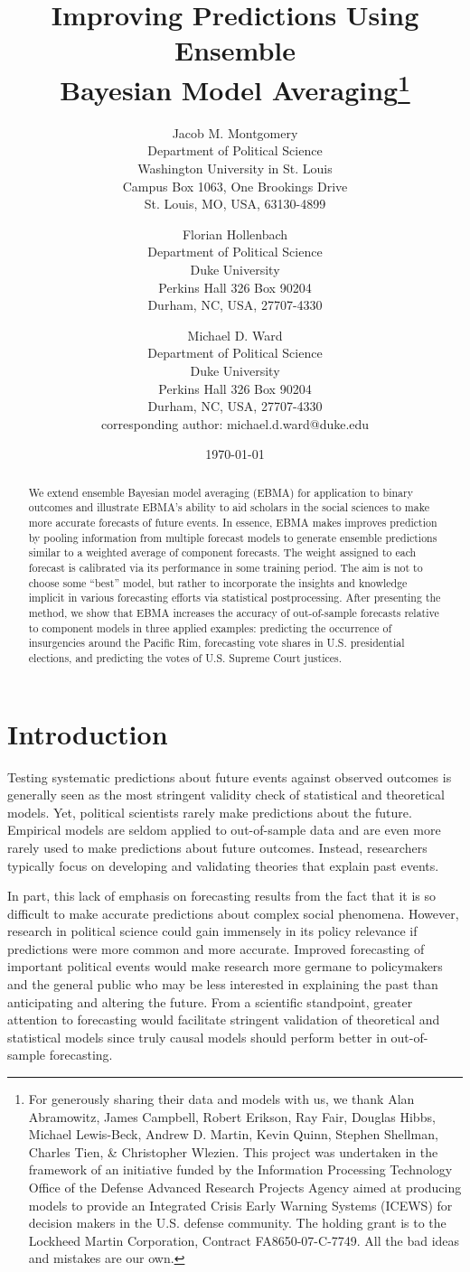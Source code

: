 \documentclass[12pt,fullpage]{article}
\title{Improving Predictions Using Ensemble \\ Bayesian Model
  Averaging\thanks{For generously sharing their data and models with
    us, we thank Alan Abramowitz, James Campbell, Robert Erikson, Ray
    Fair, Douglas Hibbs, Michael Lewis-Beck, Andrew D. Martin, Kevin
    Quinn, Stephen Shellman, Charles Tien, \& Christopher Wlezien.
    This project was undertaken in the framework of an initiative
    funded by the Information Processing Technology Office of the
    Defense Advanced Research Projects Agency aimed at producing
    models to provide an Integrated Crisis Early Warning Systems
    (ICEWS) for decision makers in the U.S. defense community. The
    holding grant is to the Lockheed Martin Corporation, Contract
    FA8650-07-C-7749. All the bad ideas and mistakes are our own.  }}
\author{
Jacob M. Montgomery\\
	Department of Political Science\\
	Washington University in St. Louis\\
	Campus Box 1063, One Brookings Drive\\
	St. Louis, MO, USA, 63130-4899 
	\and
Florian Hollenbach  \\
	Department of Political Science\\
	Duke University\\
	Perkins Hall 326 Box 90204\\
	Durham, NC, USA, 27707-4330
	\and
Michael D. Ward\\
	Department of Political Science\\
	Duke University\\
	Perkins Hall 326 Box 90204\\
	Durham, NC, USA, 27707-4330\\
	corresponding author: michael.d.ward@duke.edu
}
\date{\today}
\begin{document}
\maketitle
\thispagestyle{empty}
\clearpage
\pagestyle{myheadings}

\setcounter{page}{1}
\begin{abstract}
\begin{doublespace}
  We extend ensemble Bayesian model averaging (EBMA) for application
  to binary outcomes and illustrate EBMA's ability to aid scholars in
  the social sciences to make more accurate forecasts of future
  events.  In essence, EBMA makes improves prediction by pooling
  information from multiple forecast models to generate ensemble
  predictions similar to a weighted average of component
  forecasts. The weight assigned to each forecast is calibrated via
  its performance in some training period. The aim is not to choose
  some ``best'' model, but rather to incorporate the insights and
  knowledge implicit in various forecasting efforts via statistical
  postprocessing.  After presenting the method, we show that EBMA
  increases the accuracy of out-of-sample forecasts relative to
  component models in three applied examples: predicting the
  occurrence of insurgencies around the Pacific Rim, forecasting vote
  shares in U.S. presidential elections, and predicting the votes of
  U.S. Supreme Court justices.
\end{doublespace}
\end{abstract}

\doublespacing

\section{Introduction}
Testing systematic predictions about future events against observed
outcomes is generally seen as the most stringent validity check of
statistical and theoretical models.  Yet, political scientists rarely
make predictions about the future.  Empirical models are seldom
applied to out-of-sample data and are even more rarely used to make
predictions about future outcomes. Instead, researchers typically
focus on developing and validating theories that explain past events.

In part, this lack of emphasis on forecasting results from the fact
that it is so difficult to make accurate predictions about complex
social phenomena. However, research in political science could gain
immensely in its policy relevance if predictions were more common and
more accurate.  Improved forecasting of important political events
would make research more germane to policymakers and the general
public who may be less interested in explaining the past than
anticipating and altering the future.  From a scientific standpoint,
greater attention to forecasting would facilitate stringent validation
of theoretical and statistical models since truly causal models should
perform better in out-of-sample forecasting.
\end{document}
